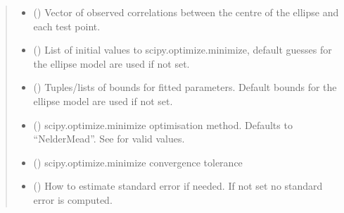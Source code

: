 \documentclass[letterpaper,10pt,english]{sphinxmanual}
\begin{document}
\begin{fulllineitems}
\begin{fulllineitems}
\begin{quote}
\begin{description}
\begin{itemize}
\item {}
\sphinxAtStartPar
{} () \textendash{} Vector of observed correlations between the centre of the ellipse
and each test point.

\item {}
\sphinxAtStartPar
{} (\sphinxstyleliteralemphasis{\sphinxupquote{{[}}}\sphinxstyleliteralemphasis{\sphinxupquote{{]} }}\sphinxstyleliteralemphasis{\sphinxupquote{| }}) \textendash{} List of initial values to scipy.optimize.minimize, default guesses
for the ellipse model are used if not set.

\item {}
\sphinxAtStartPar
{} (\sphinxstyleliteralemphasis{\sphinxupquote{{[}}}\sphinxstyleliteralemphasis{\sphinxupquote{{[}}}\sphinxstyleliteralemphasis{\sphinxupquote{, }}\sphinxstyleliteralemphasis{\sphinxupquote{{]}}}\sphinxstyleliteralemphasis{\sphinxupquote{{]} }}\sphinxstyleliteralemphasis{\sphinxupquote{| }}) \textendash{} Tuples/lists of bounds for fitted parameters. Default bounds for
the ellipse model are used if not set.

\item {}
\sphinxAtStartPar
{} () \textendash{} scipy.optimize.minimize optimisation method. Defaults to
“Nelder\sphinxhyphen{}Mead”. See 
for valid values.

\item {}
\sphinxAtStartPar
{} (\sphinxstyleliteralemphasis{\sphinxupquote{ | }}) \textendash{} scipy.optimize.minimize convergence tolerance

\item {}
\sphinxAtStartPar
{} (\sphinxstyleliteralemphasis{\sphinxupquote{ | }}) \textendash{} How to estimate standard error if needed. If not set no standard
error is computed.


\end{itemize}
\end{description}
\end{quote}
\end{fulllineitems}
\end{fulllineitems}
\end{document}
